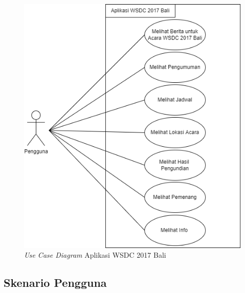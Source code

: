 \begin{figure}[H]
		\centering
	    \includegraphics[scale=0.4]{Gambar/useCaseDiagram.png}
	    \caption{{\it Use Case Diagram} Aplikasi WSDC 2017 Bali}
	    \label{fig:useCaseDiagram}
\end{figure}

\subsection{Skenario Pengguna}
\label{sec:skenarioPenggunaAplikasiSistemKini}

